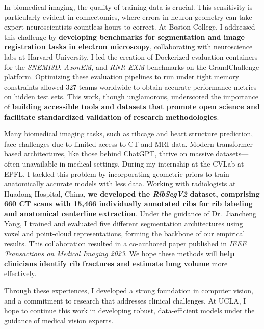 \documentclass[letterpaper,11pt]{article}
\begin{document}
In biomedical imaging, the quality of training data is crucial. This sensitivity is particularly evident in connectomics, where errors in neuron geometry can take expert neuroscientists countless hours to correct. At Boston College, I addressed this challenge by \textbf{developing benchmarks for segmentation and image registration tasks in electron microscopy}, collaborating with neuroscience labs at Harvard University. I led the creation of Dockerized evaluation containers for the \textit{SNEMI3D}, \textit{AxonEM}, and \textit{RNR-EXM} benchmarks on the GrandChallenge platform. Optimizing these evaluation pipelines to run under tight memory constraints allowed 327 teams worldwide to obtain accurate performance metrics on hidden test sets. This work, though unglamorous, underscored the importance of \textbf{building accessible tools and datasets that promote open science and facilitate standardized validation of research methodologies}.

Many biomedical imaging tasks, such as ribcage and heart structure prediction, face challenges due to limited access to CT and MRI data. Modern transformer-based architectures, like those behind ChatGPT, thrive on massive datasets---often unavailable in medical settings. During my internship at the CVLab at EPFL, I tackled this problem by incorporating geometric priors to train anatomically accurate models with less data. Working with radiologists at Huadong Hospital, China, \textbf{we developed the \textit{RibSegV2} dataset, comprising 660 CT scans with 15,466 individually annotated ribs for rib labeling and anatomical centerline extraction}. Under the guidance of Dr.\ Jiancheng Yang, I trained and evaluated five different segmentation architectures using voxel and point-cloud representations, forming the backbone of our empirical results. This collaboration resulted in a co-authored paper published in \textit{IEEE Transactions on Medical Imaging 2023}. We hope these methods will \textbf{help clinicians identify rib fractures and estimate lung volume} more effectively.

Through these experiences, I developed a strong foundation in computer vision, and a commitment to research that addresses clinical challenges. At UCLA, I hope to continue this work in developing robust, data-efficient models under the guidance of medical vision experts.
\end{document}

